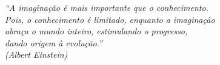 \documentclass[
	12pt,				%
	openright,			%
	twoside,			%
	a4paper,			%
	english,			%
	french,				%
	spanish,			%
	brazil				%
	]{abntex2}
\begin{document}
\frenchspacing 


\imprimircapa



\imprimirfolhaderosto

% 
%


% 
%






\begin{epigrafe}
    \vspace*{\fill}
	\begin{flushright}
		\textit{``A imaginação é mais importante que o conhecimento. \\
		        Pois, o conhecimento é limitado, enquanto a imaginação \\
		        abraça o mundo inteiro, estimulando o progresso, \\
		        dando origem à evolução.''\\
		(Albert Einstein)}
	\end{flushright}
\end{epigrafe}






\renewcommand{\listingscaption}{Algoritmo}
\renewcommand{\listoflistingscaption}{Lista de Códigos Fonte}
\listoflistings
\cleardoublepage

\listoffigures*
\cleardoublepage
\end{document}
